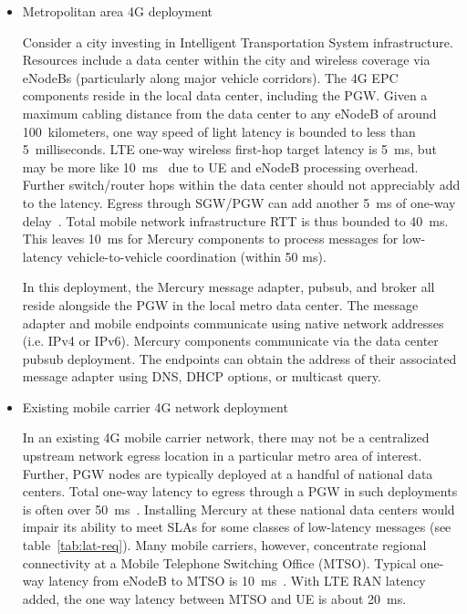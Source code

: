 \begin{itemize}

\item Metropolitan area 4G deployment

Consider a city investing in Intelligent Transportation System
infrastructure. Resources include a data center within the city and
wireless coverage via eNodeBs (particularly along major vehicle
corridors). The 4G EPC components reside in the local data center,
including the PGW.  Given a maximum cabling distance from the data
center to any eNodeB of around 100~kilometers, one way speed of light
latency is bounded to less than 5~milliseconds.  LTE one-way wireless
first-hop target latency is 5~ms, but may be more like
10~ms~\cite{RAN-latency} due to UE and eNodeB processing overhead.
Further switch/router hops within the data center should not
appreciably add to the latency. Egress through SGW/PGW can add another
5~ms of one-way delay~\cite{EPC-latency}.  Total mobile network
infrastructure RTT is thus bounded to 40~ms. This leaves 10~ms for
Mercury components to process messages for low-latency
vehicle-to-vehicle coordination (within 50 ms).

In this deployment, the Mercury message adapter, pubsub, and broker
all reside alongside the PGW in the local metro data center. The
message adapter and mobile endpoints communicate using native network
addresses (i.e. IPv4 or IPv6).  Mercury components communicate via the
data center pubsub deployment. The endpoints can obtain the address
of their associated message adapter using DNS, DHCP options, or
multicast query.

\item Existing mobile carrier 4G network deployment

In an existing 4G mobile carrier network, there may not be a
centralized upstream network egress location in a particular metro
area of interest. Further, PGW nodes are typically deployed at a
handful of national data centers.  Total one-way latency to egress
through a PGW in such deployments is often over
50~ms~\cite{carrier-latency}. Installing Mercury at these national
data centers would impair its ability to meet SLAs for some classes of
low-latency messages (see table~\ref{tab:lat-req}). Many mobile
carriers, however, concentrate regional connectivity at a Mobile
Telephone Switching Office (MTSO).  Typical one-way latency from
eNodeB to MTSO is 10~ms~\cite{MTSO-latency}. With LTE RAN latency
added, the one way latency between MTSO and UE is about 20~ms.


\end{itemize}
